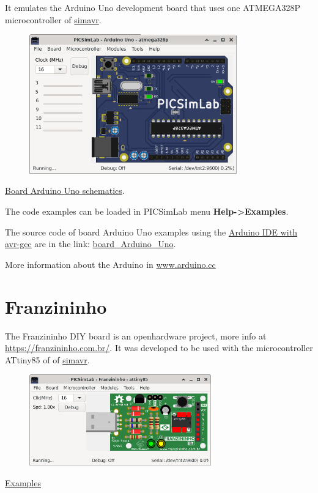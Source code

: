 It emulates the Arduino Uno development board that uses one ATMEGA328P microcontroller of \href{https://github.com/buserror/simavr}{simavr}.

\begin{figure}[H]
\center
\includegraphics[width=0.80\textwidth]{img/picsimlab5.png} 
\end{figure} 

\href{https://www.arduino.cc/en/uploads/Main/Arduino_Uno_Rev3-schematic.pdf}{Board Arduino Uno schematics}.\vspace{0.5cm}

The code examples can be loaded in PICSimLab menu \textbf{Help->Examples}.

The source code of board Arduino Uno examples using the 
\href{https://www.arduino.cc/en/Main/Software}{Arduino IDE with avr-gcc} are in the link: 
\href{https://lcgamboa.github.io/picsimlab_examples/examples/examples_index.html\#board_Arduino_Uno}{board\_Arduino\_Uno}.

More information about the Arduino in \href{https://www.arduino.cc/}{www.arduino.cc}

\section{Franzininho}

The Franzininho DIY board is an openhardware project, more info at \href{https://franzininho.com.br/}{https://franzininho.com.br/}.
It was developed to be used with the microcontroller ATtiny85 of 
of \href{https://github.com/buserror/simavr}{simavr}.

\begin{figure}[H]
\center
\includegraphics[width=0.7\textwidth]{img/board_Franzininho.png} 
\end{figure} 

\href{https://lcgamboa.github.io/picsimlab_examples/examples/examples_index.html\#board_Franzininho}{Examples}

